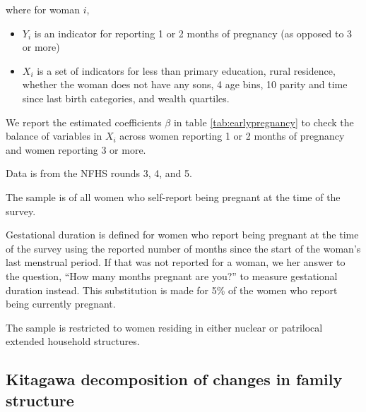 \documentclass[12pt]{article}
\begin{document}
where for woman $i$, 
\begin{itemize}
    \item $Y_i$ is an indicator for reporting 1 or 2 months of pregnancy (as opposed to 3 or more)
    \item $X_i$ is a set of indicators for less than primary education, rural residence, whether the woman does not have any sons, 4 age bins, 10 parity and time since last birth categories, and wealth quartiles. 
\end{itemize}

We report the estimated coefficients $\beta$ in table \ref{tab:earlypregnancy} to check the balance of variables in $X_i$ across women reporting 1 or 2 months of pregnancy and women reporting 3 or more.

\begin{table}[H]
    \centering
    \begin{threeparttable}[t]
        \caption{:  Predicting early pregnancy}

        \label{tab:earlypregnancy}
        \scriptsize
        \setlength{\tabcolsep}{10pt}
        \renewcommand{\arraystretch}{1}

        

        \begin{tablenotes}
            \item Data is from the NFHS rounds 3, 4, and 5.
            \item The sample is of all women who self-report being pregnant at the time of the survey. 
            \item Gestational duration is defined for women who report being pregnant at the time of the survey using the reported number of months since the start of the woman's last menstrual period.  If that was not reported for a woman, we her answer to the question, ``How many months pregnant are you?'' to measure gestational duration instead. This substitution is made for 5\% of the women who report being currently pregnant. 
            \item The sample is restricted to women residing in either nuclear or patrilocal extended household structures. 
            
        \end{tablenotes}
    \end{threeparttable}
\end{table}

\subsection{Kitagawa decomposition of changes in family structure}
\end{document}
